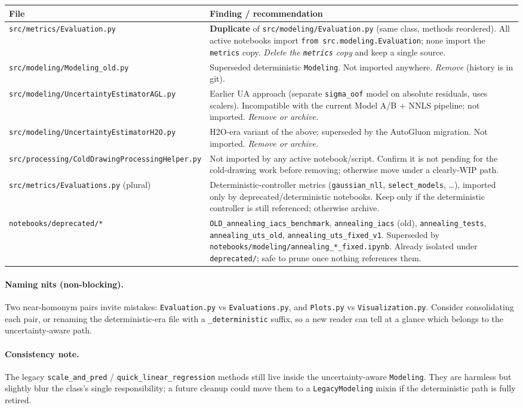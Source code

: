 \documentclass[11pt,a4paper]{article}
\newcommand{\code}[1]{\texttt{\small #1}}
\newcommand{\file}[1]{\texttt{\small #1}}
\begin{document}
\begin{longtable}{@{}p{}p{}@{}}
\toprule
\textbf{File} & \textbf{Finding / recommendation} \\
\midrule
\endhead
\file{src/metrics/Evaluation.py} &
  \textbf{Duplicate} of \file{src/modeling/Evaluation.py} (same class, methods
  reordered). All active notebooks import \code{from src.modeling.Evaluation};
  none import the \file{metrics} copy. \emph{Delete the \file{metrics} copy} and
  keep a single source. \\
\file{src/modeling/Modeling\_old.py} &
  Superseded deterministic \code{Modeling}. Not imported anywhere.
  \emph{Remove} (history is in git). \\
\file{src/modeling/UncertaintyEstimatorAGL.py} &
  Earlier UA approach (separate \code{sigma\_oof} model on absolute residuals,
  uses scalers). Incompatible with the current Model A/B + NNLS pipeline; not
  imported. \emph{Remove or archive.} \\
\file{src/modeling/UncertaintyEstimatorH2O.py} &
  H2O-era variant of the above; superseded by the AutoGluon migration. Not
  imported. \emph{Remove or archive.} \\
\file{src/processing/ColdDrawingProcessingHelper.py} &
  Not imported by any active notebook/script. Confirm it is not pending for the
  cold-drawing work before removing; otherwise move under a clearly-WIP path. \\
\file{src/metrics/Evaluations.py} (plural) &
  Deterministic-controller metrics (\code{gaussian\_nll},
  \code{select\_models}, \dots), imported only by deprecated/deterministic
  notebooks. Keep only if the deterministic controller is still referenced;
  otherwise archive. \\
\file{notebooks/deprecated/*} &
  \file{OLD\_annealing\_iacs\_benchmark}, \file{annealing\_iacs} (old),
  \file{annealing\_tests}, \file{annealing\_uts\_old},
  \file{annealing\_uts\_fixed\_v1}. Superseded by
  \file{notebooks/modeling/annealing\_*\_fixed.ipynb}. Already isolated under
  \file{deprecated/}; safe to prune once nothing references them. \\
\bottomrule
\end{longtable}

\paragraph{Naming nits (non-blocking).} Two near-homonym pairs invite mistakes:
\file{Evaluation.py} vs \file{Evaluations.py}, and \file{Plots.py} vs
\file{Visualization.py}. Consider consolidating each pair, or renaming the
deterministic-era file with a \code{\_deterministic} suffix, so a new reader can
tell at a glance which belongs to the uncertainty-aware path.

\paragraph{Consistency note.} The legacy \code{scale\_and\_pred} /
\code{quick\_linear\_regression} methods still live inside the
uncertainty-aware \code{Modeling}. They are harmless but slightly blur the
class's single responsibility; a future cleanup could move them to a
\code{LegacyModeling} mixin if the deterministic path is fully retired.
\end{document}
